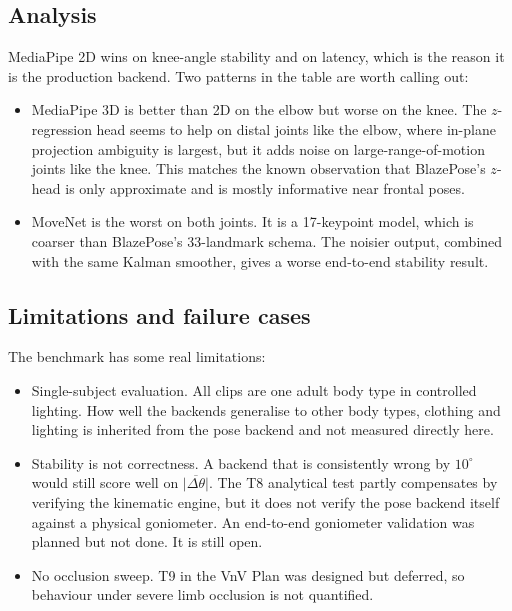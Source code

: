 \documentclass[11pt]{article}
\begin{document}
\subsection{Analysis}

MediaPipe 2D wins on knee-angle stability and on latency, which is
the reason it is the production backend. Two patterns in the table
are worth calling out:

\begin{itemize}
  \item MediaPipe 3D is better than 2D on the elbow but worse on the
    knee. The $z$-regression head seems to help on distal joints like
    the elbow, where in-plane projection ambiguity is largest, but it
    adds noise on large-range-of-motion joints like the knee. This
    matches the known observation that BlazePose's $z$-head is only
    approximate and is mostly informative near frontal poses.
  \item MoveNet is the worst on both joints. It is a 17-keypoint
    model, which is coarser than BlazePose's 33-landmark schema. The
    noisier output, combined with the same Kalman smoother, gives a
    worse end-to-end stability result.
\end{itemize}

\subsection{Limitations and failure cases}

The benchmark has some real limitations:

\begin{itemize}
  \item Single-subject evaluation. All clips are one adult body type
    in controlled lighting. How well the backends generalise to other
    body types, clothing and lighting is inherited from the pose
    backend and not measured directly here.
  \item Stability is not correctness. A backend that is consistently
    wrong by $10^{\circ}$ would still score well on
    $\overline{|\Delta\theta|}$. The T8 analytical test partly
    compensates by verifying the kinematic engine, but it does not
    verify the pose backend itself against a physical goniometer. An
    end-to-end goniometer validation was planned but not done. It is
    still open.
  \item No occlusion sweep. T9 in the VnV Plan was designed but
    deferred, so behaviour under severe limb occlusion is not
    quantified.
\end{itemize}
\end{document}
